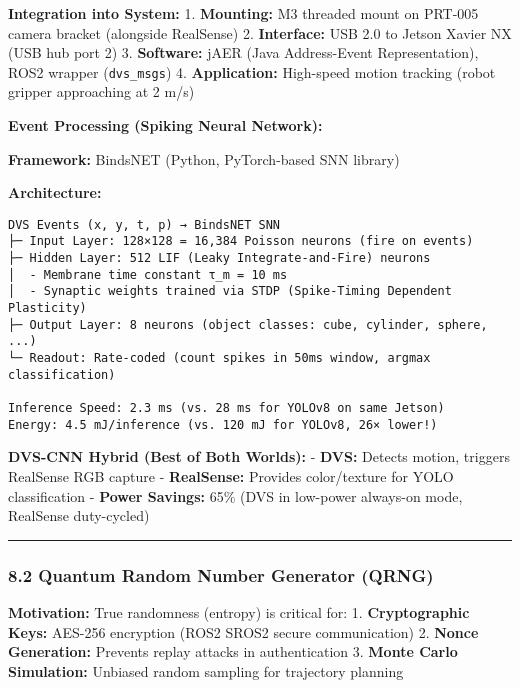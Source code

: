 \documentclass[
]{article}
\begin{document}
\textbf{Integration into System:} 1. \textbf{Mounting:} M3 threaded
mount on PRT-005 camera bracket (alongside RealSense) 2.
\textbf{Interface:} USB 2.0 to Jetson Xavier NX (USB hub port 2) 3.
\textbf{Software:} jAER (Java Address-Event Representation), ROS2
wrapper (\texttt{dvs\_msgs}) 4. \textbf{Application:} High-speed motion
tracking (robot gripper approaching at 2 m/s)

\textbf{Event Processing (Spiking Neural Network):}

\textbf{Framework:} BindsNET (Python, PyTorch-based SNN library)

\textbf{Architecture:}

\begin{verbatim}
DVS Events (x, y, t, p) → BindsNET SNN
├─ Input Layer: 128×128 = 16,384 Poisson neurons (fire on events)
├─ Hidden Layer: 512 LIF (Leaky Integrate-and-Fire) neurons
│  - Membrane time constant τ_m = 10 ms
│  - Synaptic weights trained via STDP (Spike-Timing Dependent Plasticity)
├─ Output Layer: 8 neurons (object classes: cube, cylinder, sphere, ...)
└─ Readout: Rate-coded (count spikes in 50ms window, argmax classification)

Inference Speed: 2.3 ms (vs. 28 ms for YOLOv8 on same Jetson)
Energy: 4.5 mJ/inference (vs. 120 mJ for YOLOv8, 26× lower!)
\end{verbatim}

\textbf{DVS-CNN Hybrid (Best of Both Worlds):} - \textbf{DVS:} Detects
motion, triggers RealSense RGB capture - \textbf{RealSense:} Provides
color/texture for YOLO classification - \textbf{Power Savings:} 65\%
(DVS in low-power always-on mode, RealSense duty-cycled)

\begin{center}\rule{0.5\linewidth}{0.5pt}\end{center}

\hypertarget{quantum-random-number-generator-qrng}{%
\subsubsection{8.2 Quantum Random Number Generator
(QRNG)}\label{quantum-random-number-generator-qrng}}

\textbf{Motivation:} True randomness (entropy) is critical for: 1.
\textbf{Cryptographic Keys:} AES-256 encryption (ROS2 SROS2 secure
communication) 2. \textbf{Nonce Generation:} Prevents replay attacks in
authentication 3. \textbf{Monte Carlo Simulation:} Unbiased random
sampling for trajectory planning
\end{document}
